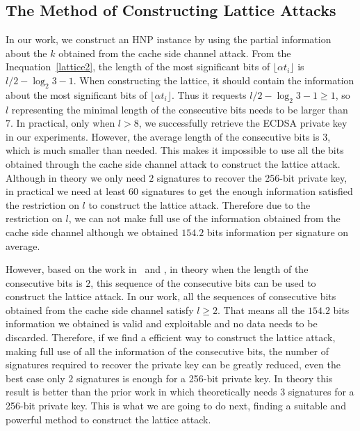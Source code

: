 \subsection{The Method of Constructing Lattice Attacks}
In our work, we construct an HNP instance by using the partial information about the $k$ obtained from the cache side channel attack.
 From the Inequation~\ref{lattice2}, the length of the most significant bits of $\lfloor\alpha t_i\rfloor$ is $l/2-\log_{2}{3} -1$.
When constructing the lattice, it should contain the information about the most significant bits of $\lfloor\alpha t_i\rfloor$.
Thus it requests $l/2-\log_{2}{3} -1 \geq 1$, so $l$ representing the minimal length of the consecutive bits needs to be larger than $7$.
In practical, only when $l > 8$, we successfully retrieve the ECDSA private key in our experiments.
However, the average length of the consecutive bits is $3$, which is much smaller than needed. 
This makes it impossible to use all the bits obtained through the cache side channel attack  to construct the lattice attack.
Although in theory we only need $2$ signatures to recover the 256-bit private key, 
 in practical we need at least $60$ signatures to get the enough information satisfied the restriction on $l$ to construct the lattice attack.
Therefore due to the restriction on $l$, we can not make full use of the information obtained from the cache side channel although we obtained $154.2$ bits information per signature on average.

However, based on the work in~\cite{Nguyen2002} and \cite{Liu2013}, 
 in theory when the length of the consecutive bits is $2$, this sequence of  the consecutive bits can be used to construct the lattice attack.
In our work, all the sequences of consecutive bits obtained from the cache side channel satisfy $l \geq 2$. 
 That means all the $154.2$ bits information we obtained is valid and exploitable and  no data needs to be discarded.
Therefore, if we find a efficient way to construct the lattice attack, making full use of all the information of the consecutive bits, 
   the number of signatures required to recover the private key can be greatly reduced, even the best case only $2$ signatures is enough for a 256-bit private key.
In theory this result is better than the prior work in \cite{Fan2016} which theoretically needs 3 signatures for a 256-bit private key.
This is what we are going to do next, finding a suitable and powerful method to construct the lattice attack.

















